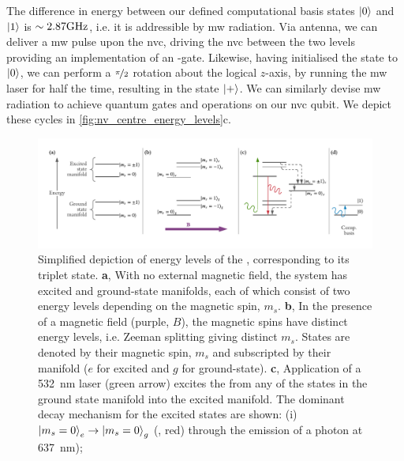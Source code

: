 The difference in energy between our defined computational basis states $\ket{0}$ and $\ket{1}$ is 
    $\sim 2.87 \textrm{GHz}$, i.e. it is addressible by \gls{mw} radiation.
Via antenna, we can deliver a \gls{mw} pulse upon the \gls{nvc}, driving the \gls{nvc} between the two levels
    providing an implementation of an -gate. 
Likewise, having initialised the state to $\ket{0}$, we can perform a $\nicefrac{\pi}{2}$ rotation 
    about the logical $z$-axis, by running the \gls{mw} laser for half the time, 
    resulting in the state $\ket{+}$. 
We can similarly devise \gls{mw} radiation to achieve quantum gates and operations on our \gls{nvc} qubit.
We depict these cycles in \cref{fig:nv_centre_energy_levels}c. 
\par

\begin{figure}[t]
    \begin{center}
        \includegraphics[width=0.95\linewidth]{experimental_study/figures/nv_centre_cartoon.pdf}
    \end{center}
    \caption[ energy levels]{
        Simplified depiction of energy levels of the , corresponding to its triplet state. 
        \textbf{a}, With no external magnetic field, the system has excited and ground-state manifolds, 
            each of which consist of two energy levels depending on the magnetic spin, $m_s$.
        \textbf{b}, In the presence of a magnetic field (purple, $B$), the magnetic spins have distinct energy levels, 
            i.e. Zeeman splitting giving distinct $m_s$. 
        States are denoted by their magnetic spin, $m_s$ and subscripted by their manifold ($e$ for excited and $g$ for ground-state). 
        \textbf{c},  Application of a \SI{532}{\nano\metre} laser (green arrow) excites the  from any of the states in the 
            ground state manifold into the excited manifold. 
        The dominant decay mechanism for the excited states are shown: 
            (i) $\ket{m_s=0}_e \rightarrow \ket{m_s=0}_g$ (, red) through the emission of a photon at \SI{637}{\nano\metre});
}
\end{figure}
